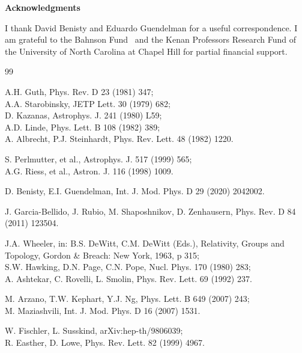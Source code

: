 \documentclass[12pt]{article}
\begin{document}

\vspace{1in}

\noindent
{\bf Acknowledgments}

I thank David Benisty and Eduardo Guendelman for a useful correspondence.
I am grateful to the Bahnson Fund  and the Kenan
Professors Research Fund of the
University of North Carolina at Chapel Hill for partial financial support.
\\


\newpage

\begin{thebibliography}{99}

A.H. Guth, Phys. Rev. D 23 (1981) 347;\\
A.A. Starobinsky, JETP Lett. 30 (1979) 682; \\
D. Kazanas, Astrophys. J. 241 (1980) L59;\\
A.D. Linde, Phys. Lett. B 108 (1982) 389; \\
A. Albrecht, P.J. Steinhardt, Phys. Rev. Lett. 48 (1982) 1220.


S. Perlmutter, et al., Astrophys. J. 517 (1999) 565;\\
A.G. Riess, et al., Astron. J. 116 (1998) 1009.


D. Benisty, E.I. Guendelman, 
Int. J. Mod. Phys. D 29 (2020) 2042002.

J. Garcia-Bellido, J. Rubio, M. Shaposhnikov, D. Zenhausern,
Phys. Rev. D 84 (2011) 123504.

J.A. Wheeler,  in: 
B.S. DeWitt, C.M. DeWitt (Eds.),
Relativity, Groups and Topology,
Gordon \& Breach: New York, 1963, p 315; \\
S.W. Hawking, D.N. Page, C.N. Pope, 
Nucl. Phys. 170 (1980) 283; \\
A. Ashtekar, C. Rovelli, L. Smolin, 
Phys. Rev. Lett. 69 (1992) 237.


M. Arzano, T.W. Kephart, Y.J. Ng, 
Phys. Lett. B 649 (2007) 243;\\
M. Maziashvili,  
Int. J. Mod. Phys. D 16 (2007) 1531.


W. Fischler, L. Susskind, 
arXiv:hep-th/9806039; \\
R. Easther, D. Lowe, 
Phys. Rev. Lett. 82 (1999) 4967.


\end{thebibliography}
\end{document}
